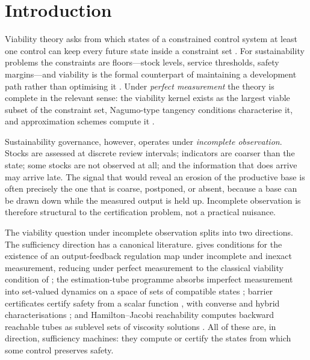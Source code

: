 \section{Introduction}\label{sec:intro}

Viability theory asks from which states of a constrained control system at least one control can keep every future state inside a constraint set \citep{aubin1991}. For sustainability problems the constraints are floors---stock levels, service thresholds, safety margins---and viability is the formal counterpart of maintaining a development path rather than optimising it \citep{bene2001,delara2008,doyen2012,doyen2020}. Under \emph{perfect measurement} the theory is complete in the relevant sense: the viability kernel exists as the largest viable subset of the constraint set, Nagumo-type tangency conditions characterise it, and approximation schemes compute it \citep{saintpierre1994,aubin2011}.

Sustainability governance, however, operates under \emph{incomplete observation}. Stocks are assessed at discrete review intervals; indicators are coarser than the state; some stocks are not observed at all; and the information that does arrive may arrive late. The signal that would reveal an erosion of the productive base is often precisely the one that is coarse, postponed, or absent, because a base can be drawn down while the measured output is held up. Incomplete observation is therefore structural to the certification problem, not a practical nuisance.

The viability question under incomplete observation splits into two directions. The sufficiency direction has a canonical literature. \citet{veliov1993} gives conditions for the existence of an output-feedback regulation map under incomplete and inexact measurement, reducing under perfect measurement to the classical viability condition of \citet{haddad1981}; the estimation-tube programme absorbs imperfect measurement into set-valued dynamics on a space of sets of compatible states \citep{kurzhanski1997,cardaliaguet2007}; barrier certificates certify safety from a scalar function \citep{prajna2004,prajna2007}, with converse and hybrid characterisations \citep{prajna2005,maghenem2019}; and Hamilton--Jacobi reachability computes backward reachable tubes as sublevel sets of viscosity solutions \citep{mitchell2005,margellos2011,bansal2017}. All of these are, in direction, sufficiency machines: they compute or certify the states from which some control preserves safety.

